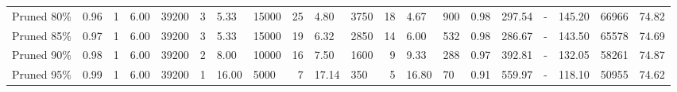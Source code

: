 \begin{table*}
{\begin{tabular}{llrllrllrllrllrlllll}
 Pruned 80\% &     0.96 &               1 &       6.00 &   39200 &                 3 &       5.33 &   15000 &                25 &       4.80 &    3750 &           18 &       4.67 &     900 & 0.98 & 297.54 &      - &  145.20 &  66966 &     74.82 \\
 Pruned 85\% &     0.97 &               1 &       6.00 &   39200 &                 3 &       5.33 &   15000 &                19 &       6.32 &    2850 &           14 &       6.00 &     532 & 0.98 & 286.67 &      - &  143.50 &  65578 &     74.69 \\
 Pruned 90\% &     0.98 &               1 &       6.00 &   39200 &                 2 &       8.00 &   10000 &                16 &       7.50 &    1600 &            9 &       9.33 &     288 & 0.97 & 392.81 &      - &  132.05 &  58261 &     74.87 \\
 Pruned 95\% &     0.99 &               1 &       6.00 &   39200 &                 1 &      16.00 &    5000 &                 7 &      17.14 &     350 &            5 &      16.80 &      70 & 0.91 & 559.97 &      - &  118.10 &  50955 &     74.62 \\
\bottomrule
\end{tabular}}
\end{table*}



